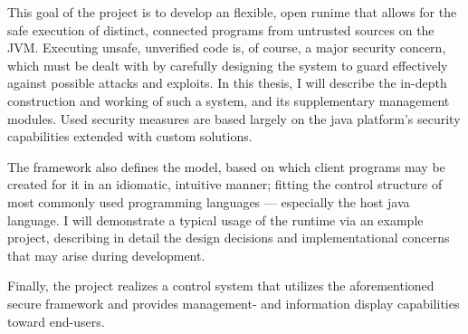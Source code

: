 This goal of the project is to develop an flexible, open runime that allows for the safe execution of distinct, connected programs from untrusted sources on the JVM. Executing unsafe, unverified code is, of course, a major security concern, which must be dealt with by carefully designing the system to guard effectively against possible attacks and exploits. In this thesis, I will describe the in-depth construction and working of such a system, and its supplementary management modules. Used security measures are based largely on the java platform's security capabilities extended with custom solutions.

The framework also defines the model, based on which client programs may be created for it in an idiomatic, intuitive manner; fitting the control structure of most commonly used programming languages --- especially the host java language. I will demonstrate a typical usage of the runtime via an example project, describing in detail the design decisions and implementational concerns that may arise during development.

Finally, the project realizes a control system that utilizes the aforementioned secure framework and provides management- and information display capabilities toward end-users.


\vfill

%